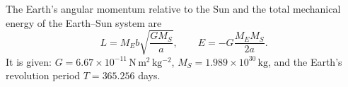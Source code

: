 The Earth's angular momentum relative to the Sun and the total mechanical
energy of the Earth--Sun system are
\[
L=M_Eb\sqrt{\frac{GM_S}{a}},\qquad E=-G\frac{M_EM_S}{2a}.
\]
It is given: $G=6.67\times10^{-11}\,\mathrm{N\,m^2\,kg^{-2}}$,
$M_S=1.989\times10^{30}\,\mathrm{kg}$, and the Earth's revolution period
$T=365.256$ days.
